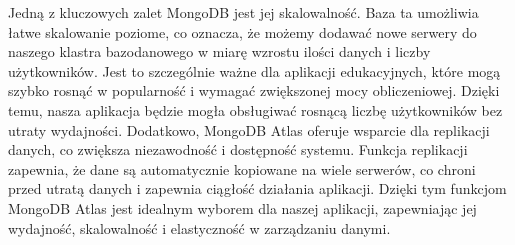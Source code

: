 Jedną z kluczowych zalet MongoDB jest jej skalowalność. Baza ta umożliwia łatwe skalowanie poziome, co oznacza, że możemy dodawać nowe serwery do naszego klastra bazodanowego w miarę wzrostu ilości danych i liczby użytkowników. Jest to szczególnie ważne dla aplikacji edukacyjnych, które mogą szybko rosnąć w popularność i wymagać zwiększonej mocy obliczeniowej. Dzięki temu, nasza aplikacja będzie mogła obsługiwać rosnącą liczbę użytkowników bez utraty wydajności. Dodatkowo, MongoDB Atlas oferuje wsparcie dla replikacji danych, co zwiększa niezawodność i dostępność systemu. Funkcja replikacji zapewnia, że dane są automatycznie kopiowane na wiele serwerów, co chroni przed utratą danych i zapewnia ciągłość działania aplikacji. Dzięki tym funkcjom MongoDB Atlas jest idealnym wyborem dla naszej aplikacji, zapewniając jej wydajność, skalowalność i elastyczność w zarządzaniu danymi. 

 